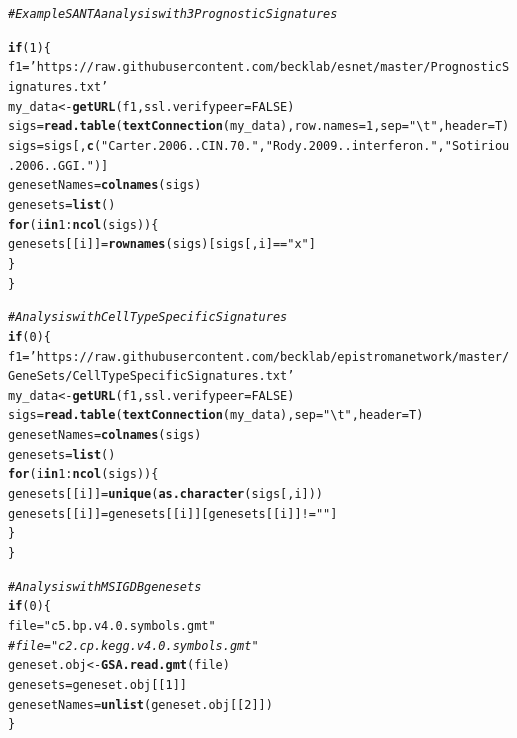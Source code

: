 \documentclass{article}\usepackage[]{graphicx}\usepackage[]{color}
\makeatletter
\newcommand{\hlnum}[1]{\textcolor[rgb]{0.686,0.059,0.569}{#1}}%
\newcommand{\hlstr}[1]{\textcolor[rgb]{0.192,0.494,0.8}{#1}}%
\newcommand{\hlcom}[1]{\textcolor[rgb]{0.678,0.584,0.686}{\textit{#1}}}%
\newcommand{\hlopt}[1]{\textcolor[rgb]{0,0,0}{#1}}%
\newcommand{\hlstd}[1]{\textcolor[rgb]{0.345,0.345,0.345}{#1}}%
\newcommand{\hlkwa}[1]{\textcolor[rgb]{0.161,0.373,0.58}{\textbf{#1}}}%
\newcommand{\hlkwb}[1]{\textcolor[rgb]{0.69,0.353,0.396}{#1}}%
\newcommand{\hlkwc}[1]{\textcolor[rgb]{0.333,0.667,0.333}{#1}}%
\newcommand{\hlkwd}[1]{\textcolor[rgb]{0.737,0.353,0.396}{\textbf{#1}}}%
\newenvironment{kframe}{%
 \def\at@end@of@kframe{}%
 \ifinner\ifhmode%
  \def\at@end@of@kframe{\end{minipage}}%
  \begin{minipage}{\columnwidth}%
 \fi\fi%
 \def\FrameCommand##1{\hskip\@totalleftmargin \hskip-\fboxsep
 \colorbox{shadecolor}{##1}\hskip-\fboxsep
     \hskip-\linewidth \hskip-\@totalleftmargin \hskip\columnwidth}%
 \MakeFramed {\advance\hsize-\width
   \@totalleftmargin\z@ \linewidth\hsize
   \@setminipage}}%
 {\par\unskip\endMakeFramed%
 \at@end@of@kframe}
\newenvironment{knitrout}{}{} %
\makeatother
\begin{document}
\begin{knitrout}
\color{fgcolor}\begin{kframe}
\begin{alltt}
\hlcom{# Example SANTA analysis with 3 Prognostic Signatures}

\hlkwa{if}\hlstd{(}\hlnum{1}\hlstd{)\{}
   \hlstd{f1}\hlkwb{=} \hlstr{'https://raw.githubusercontent.com/becklab/esnet/master/PrognosticSignatures.txt'}
   \hlstd{my_data} \hlkwb{<-} \hlkwd{getURL}\hlstd{(f1,}\hlkwc{ssl.verifypeer}\hlstd{=}\hlnum{FALSE}\hlstd{)}
   \hlstd{sigs}\hlkwb{=}\hlkwd{read.table}\hlstd{(}\hlkwd{textConnection}\hlstd{(my_data),}\hlkwc{row.names}\hlstd{=}\hlnum{1}\hlstd{,}\hlkwc{sep}\hlstd{=}\hlstr{"\textbackslash{}t"}\hlstd{,}\hlkwc{header}\hlstd{=T)}
   \hlstd{sigs}\hlkwb{=}\hlstd{sigs[,}\hlkwd{c}\hlstd{(}\hlstr{"Carter.2006..CIN.70."}\hlstd{,}\hlstr{"Rody.2009..interferon."}\hlstd{,} \hlstr{"Sotiriou.2006..GGI."} \hlstd{)]}
   \hlstd{genesetNames}\hlkwb{=}\hlkwd{colnames}\hlstd{(sigs)}
   \hlstd{genesets}\hlkwb{=}\hlkwd{list}\hlstd{()}
   \hlkwa{for}\hlstd{(i} \hlkwa{in} \hlnum{1}\hlopt{:}\hlkwd{ncol}\hlstd{(sigs))\{}
      \hlstd{genesets[[i]]}\hlkwb{=}\hlkwd{rownames}\hlstd{(sigs)[sigs[,i]}\hlopt{==}\hlstr{"x"}\hlstd{]}
   \hlstd{\}}
\hlstd{\}}

\hlcom{#Analysis with Cell Type Specific Signatures}
\hlkwa{if}\hlstd{(}\hlnum{0}\hlstd{)\{}
   \hlstd{f1}\hlkwb{=} \hlstr{'https://raw.githubusercontent.com/becklab/epistromanetwork/master/GeneSets/CellTypeSpecificSignatures.txt'}
   \hlstd{my_data} \hlkwb{<-} \hlkwd{getURL}\hlstd{(f1,}\hlkwc{ssl.verifypeer}\hlstd{=}\hlnum{FALSE}\hlstd{)}
   \hlstd{sigs}\hlkwb{=}\hlkwd{read.table}\hlstd{(}\hlkwd{textConnection}\hlstd{(my_data),}\hlkwc{sep}\hlstd{=}\hlstr{"\textbackslash{}t"}\hlstd{,}\hlkwc{header}\hlstd{=T)}
   \hlstd{genesetNames}\hlkwb{=}\hlkwd{colnames}\hlstd{(sigs)}
   \hlstd{genesets}\hlkwb{=}\hlkwd{list}\hlstd{()}
\hlkwa{for}\hlstd{(i} \hlkwa{in} \hlnum{1}\hlopt{:}\hlkwd{ncol}\hlstd{(sigs))\{}
   \hlstd{genesets[[i]]}\hlkwb{=}\hlkwd{unique}\hlstd{(}\hlkwd{as.character}\hlstd{(sigs[,i]))}
   \hlstd{genesets[[i]]}\hlkwb{=}\hlstd{genesets[[i]][genesets[[i]]}\hlopt{!=}\hlstr{""}\hlstd{]}
\hlstd{\}}
\hlstd{\}}

\hlcom{# Analysis with MSIGDB genesets}
\hlkwa{if}\hlstd{(}\hlnum{0}\hlstd{)\{}
   \hlstd{file}\hlkwb{=}\hlstr{"c5.bp.v4.0.symbols.gmt"}
   \hlcom{#file="c2.cp.kegg.v4.0.symbols.gmt"}
   \hlstd{geneset.obj}\hlkwb{<-} \hlkwd{GSA.read.gmt}\hlstd{(file)}
   \hlstd{genesets}\hlkwb{=}\hlstd{geneset.obj[[}\hlnum{1}\hlstd{]]}
   \hlstd{genesetNames}\hlkwb{=}\hlkwd{unlist}\hlstd{(geneset.obj[[}\hlnum{2}\hlstd{]])}
\hlstd{\}}


\end{alltt}
\end{kframe}
\end{knitrout}
\end{document}

